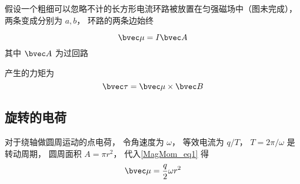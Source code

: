 

假设一个粗细可以忽略不计的长方形电流环路被放置在匀强磁场中（图未完成）， 两条变成分别为 $a, b$， 环路的两条边始终

\begin{equation}\label{MagMom_eq1}
\bvec \mu = I \bvec A
\end{equation}
其中 $\bvec A$ 为过回路

产生的力矩为
\begin{equation}
\bvec \tau = \bvec \mu \times \bvec B
\end{equation}

\subsection{旋转的电荷}
对于绕轴做圆周运动的点电荷， 令角速度为 $\omega$， 等效电流为 $q/T$， $T = 2\pi/\omega$ 是转动周期， 圆周面积 $A = \pi r^2$， 代入\autoref{MagMom_eq1} 得
\begin{equation}
\bvec \mu = \frac{q}{2} \omega r^2
\end{equation}
